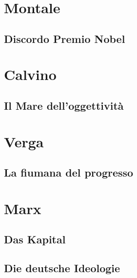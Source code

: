 \documentclass{article}
\begin{document}
\section{Montale} %
\label{sec:Montale}
\subsection{Discordo Premio Nobel} %
\label{sub:Discordo Premio Nobel}


\section{Calvino} %
\label{sec:Calvino}
\subsection{Il Mare dell'oggettività} %
\label{sub:Il Mare dell'oggettività}
\section{Verga} %
\label{sec:Verga}
\subsection{La fiumana del progresso} %
\label{sub:La fiumana del progresso}




\section{Marx} %
\label{sec:Marx}
\subsection{Das Kapital} %
\label{sub:Das Kapital}
\subsection{Die deutsche Ideologie} %
\label{sub:Die deutsche Ideologie}


\printbibliography
\end{document}
